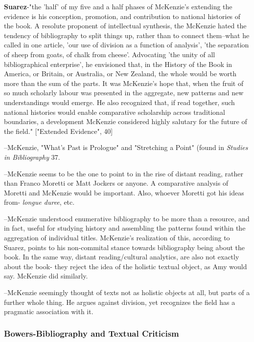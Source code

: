 \documentclass[course, english]{Notes}
\newcommand{\n}{\scalebox{2}{\textbf{\framebox{$\aleph$} } } }
\begin{document}
\textbf{Suarez}-"the 'half' of my five and a half phases of McKenzie's extending the evidence is his conception, promotion, and contribution to national histories of the book. A resolute proponent of intellectual synthesis, the McKenzie hated the tendency of bibliography to split things up, rather than to connect them--what he called in one article, 'our use of division as a function of analysis', 'the separation of sheep from goats, of chalk from cheese'. Advocating 'the unity of all bibliographical  enterprise', he envisioned that, in the History of the Book in America, or Britain, or Australia, or New Zealand, the whole would be worth more than the sum of the parts. It was McKenzie's hope that, when the fruit of so much scholarly labour was presented in the aggregate, new patterns and new understandings would emerge. He also recognized that, if read together, such national histories would enable comparative scholarship across traditional boundaries, a development McKenzie considered highly salutary for the future of the field." ["Extended Evidence", 40]
	\begin{displayquote}
	--McKenzie, "What's Past is Prologue" and "Stretching a Point" (found in \emph{Studies in Bibliography} 37.
	\end{displayquote}
	
\n --McKenzie seems to be the one to point to in the rise of distant reading, rather than Franco Moretti or Matt Jockers or anyone. A comparative analysis of Moretti and McKenzie would be important. Also, whoever Moretti got his ideas from- \emph{longue duree}, etc. 

\n --McKenzie understood enumerative bibliography to be more than a resource, and in fact, useful for studying history and assembling the patterns found within the aggregation of individual titles. McKenzie's realization of this, according to Suarez, points to his non-commital stance towards bibliography being about the book. In the same way, distant reading/cultural analytics, are also not exactly about the book- they reject the idea of the holistic textual object, as Amy would say. McKenzie did similarly.

\n --McKenzie seemingly thought of texts not as holistic objects at all, but parts of a further whole thing. He argues against division, yet recognizes the field has a pragmatic association with it. 



\subsubsection{Bowers-Bibliography and Textual Criticism}
\end{document}
